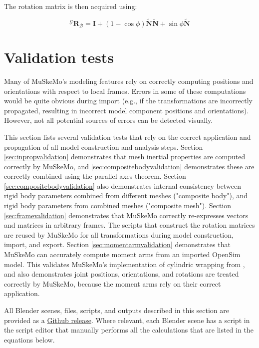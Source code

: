 \documentclass{article}
\begin{document}
The rotation matrix is then acquired using:

\begin{equation}
{}^{\mathcal{G}} \mathbf{R}_{\mathcal{B}} = \mathbf{I} + (1 - \cos\phi) \tilde{\mathbf{N}} \tilde{\mathbf{N}} + \sin\phi \tilde{\mathbf{N}}
\end{equation}


\section{Validation tests}

Many of MuSkeMo's modeling features rely on correctly computing positions and orientations with respect to local frames. Errors in some of these computations would be quite obvious during import (e.g., if the transformations are incorrectly propagated, resulting in incorrect model component positions and orientations). However, not all potential sources of errors can be detected visually. 

This section lists several validation tests that rely on the correct application and propagation of all model construction and analysis steps. Section \ref{sec:inpropvalidation} demonstrates that mesh inertial properties are computed correctly by MuSkeMo, and \ref{sec:compositebodyvalidation} demonstrates these are correctly combined using the parallel axes theorem. Section \ref{sec:compositebodyvalidation} also demonstrates internal consistency between rigid body parameters combined from different meshes ("composite body"), and rigid body parameters from combined meshes ("composite mesh"). Section \ref{sec:framevalidation} demonstrates that MuSkeMo correctly re-expresses vectors and matrices in arbitrary frames. The scripts that construct the rotation matrices are reused by MuSkeMo for all transformations during model construction, import, and export. Section \ref{sec:momentarmvalidation} demonstrates that MuSkeMo can accurately compute moment arms from an imported OpenSim model. This validates MuSkeMo's implementation of cylindric wrapping from \cite{garnerObstacleSetMethodRepresenting2000}, and also demonstrates joint positions, orientations, and rotations are treated correctly by MuSkeMo, because the moment arms rely on their correct application.

All Blender scenes, files, scripts, and outputs described in this section are provided as a \href{https://github.com/PashavanBijlert/MuSkeMo/releases/tag/v0.x}{Github release}. Where relevant, each Blender scene has a script in the script editor that manually performs all the calculations that are listed in the equations below.
\end{document}
